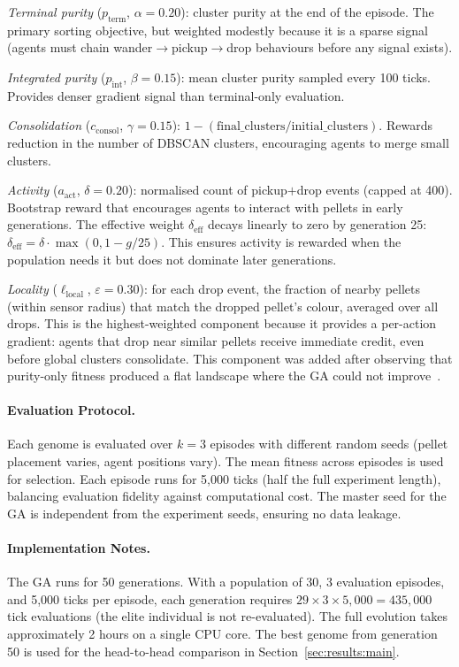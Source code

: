 \documentclass[11pt,a4paper]{article}
\begin{document}
\textit{Terminal purity} (\(p_\text{term}\), \(\alpha\!=\!0.20\)): cluster purity at the end of the episode. The primary sorting objective, but weighted modestly because it is a sparse signal (agents must chain wander\(\to\)pickup\(\to\)drop behaviours before any signal exists).

\textit{Integrated purity} (\(p_\text{int}\), \(\beta\!=\!0.15\)): mean cluster purity sampled every 100 ticks. Provides denser gradient signal than terminal-only evaluation.

\textit{Consolidation} (\(c_\text{consol}\), \(\gamma\!=\!0.15\)): \(1 - (\text{final\_clusters} / \text{initial\_clusters})\). Rewards reduction in the number of DBSCAN clusters, encouraging agents to merge small clusters.

\textit{Activity} (\(a_\text{act}\), \(\delta\!=\!0.20\)): normalised count of pickup\(+\)drop events (capped at 400). Bootstrap reward that encourages agents to interact with pellets in early generations. The effective weight \(\delta_\text{eff}\) decays linearly to zero by generation 25: \(\delta_\text{eff} = \delta \cdot \max(0, 1 - g/25)\). This ensures activity is rewarded when the population needs it but does not dominate later generations.

\textit{Locality} (\(\ell_\text{local}\), \(\varepsilon\!=\!0.30\)): for each drop event, the fraction of nearby pellets (within sensor radius) that match the dropped pellet's colour, averaged over all drops. This is the highest-weighted component because it provides a per-action gradient: agents that drop near similar pellets receive immediate credit, even before global clusters consolidate. This component was added after observing that purity-only fitness produced a flat landscape where the GA could not improve~\cite{gross2011}.

\paragraph{Evaluation Protocol.}
Each genome is evaluated over \(k\!=\!3\) episodes with different random seeds (pellet placement varies, agent positions vary). The mean fitness across episodes is used for selection. Each episode runs for 5,000 ticks (half the full experiment length), balancing evaluation fidelity against computational cost. The master seed for the GA is independent from the experiment seeds, ensuring no data leakage.

\paragraph{Implementation Notes.}
The GA runs for 50 generations. With a population of 30, 3 evaluation episodes, and 5,000 ticks per episode, each generation requires \(29 \times 3 \times 5{,}000 = 435{,}000\) tick evaluations (the elite individual is not re-evaluated). The full evolution takes approximately 2 hours on a single CPU core. The best genome from generation 50 is used for the head-to-head comparison in Section~\ref{sec:results:main}.
\end{document}
